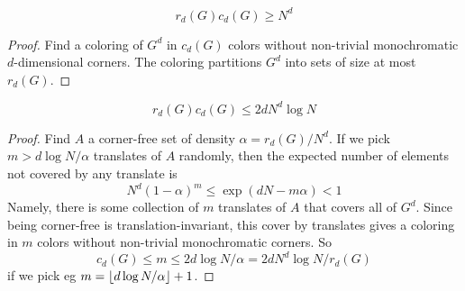 \begin{lemma}
  \label{lem:corner-num-lower}

  $$r_d(G) c_d(G) \ge N^d$$
\end{lemma}
\begin{proof}

  Find a coloring of $G^d$ in $c_d(G)$ colors without non-trivial monochromatic $d$-dimensional corners. The coloring partitions $G^d$ into sets of size at most $r_d(G)$.
\end{proof}

\begin{lemma}
  \label{lem:corner-num-upper}

  $$r_d(G) c_d(G) \le 2d N^d \log N$$
\end{lemma}
\begin{proof}

  Find $A$ a corner-free set of density $\alpha = r_d(G)/N^d$. If we pick $m > d\log N/\alpha$ translates of $A$ randomly, then the expected number of elements not covered by any translate is
  $$N^d(1 - \alpha)^m \le \exp(dN - m\alpha) < 1$$
  Namely, there is some collection of $m$ translates of $A$ that covers all of $G^d$. Since being corner-free is translation-invariant, this cover by translates gives a coloring in $m$ colors without non-trivial monochromatic corners. So
  $$c_d(G) \le m \le 2d \log N/\alpha = 2d N^d \log N/r_d(G)$$
  if we pick eg $m = \left\lfloor d\log N/\alpha\right\rfloor + 1$.
\end{proof}
